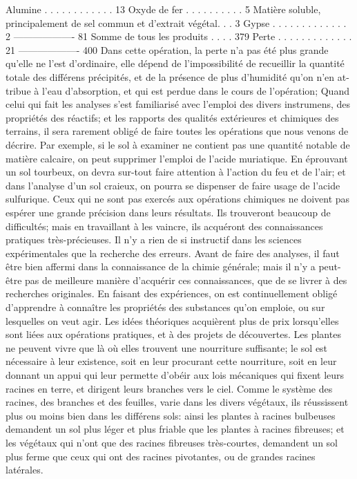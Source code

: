 Alumine . . . . . . . . . . . . 13
Oxyde de fer . . . . . . . . . . 5
Matière soluble, principalement de sel commun et d'extrait végétal. . . 3
Gypse . . . . . . . . . . . . . 2
-------------------                                81
Somme de tous les produits . . . . 379
Perte . . . . . . . . . . . . . 21
-------------------                                   400
Dans cette opération, la perte n'a pas été plus grande qu'elle ne l'est d'ordinaire, elle dépend de l'impossibilité de recueillir la quantité totale des différens précipités, et de la présence de plus d'humidité qu'on n'en at-\setcounter{page}{437} tribue à l'eau d'absorption, et qui est perdue dans le cours de l'opération; Quand celui qui fait les analyses s'est familiarisé avec l'emploi des divers instrumens, des propriétés des réactifs; et les rapports des qualités extérieures et chimiques des terrains, il sera rarement obligé de faire toutes les opérations que nous venons de décrire. Par exemple, si le sol à examiner ne contient pas une quantité notable de matière calcaire, on peut supprimer l'emploi de l'acide muriatique. En éprouvant un sol tourbeux, on devra sur-tout faire attention à l'action du feu et de l'air; et dans l'analyse d'un sol craieux, on pourra se dispenser de faire usage de l'acide sulfurique.
Ceux qui ne sont pas exercés aux opérations chimiques ne doivent pas espérer une grande précision dans leurs résultats. Ils trouveront beaucoup de difficultés; mais en travaillant à les vaincre, ils acquéront des connaissances pratiques très-précieuses. Il n'y a rien de si instructif dans les sciences expérimentales que la recherche des erreurs. Avant de faire des analyses, il faut être bien affermi dans la connaissance de la chimie générale; mais il n'y a peut-être pas de meilleure manière d'acquérir ces connaissances, que de se livrer à des recherches originales. En\setcounter{page}{438} faisant des expériences, on est continuellement obligé d'apprendre à connaître les propriétés des substances qu'on emploie, ou sur lesquelles on veut agir. Les idées théoriques acquièrent plus de prix lorsqu'elles sont liées aux opérations pratiques, et à des projets de découvertes.
Les plantes ne peuvent vivre que là où elles trouvent une nourriture suffisante; le sol est nécessaire à leur existence, soit en leur procurant cette nourriture, soit en leur donnant un appui qui leur permette d'obéir aux lois mécaniques qui fixent leurs racines en terre, et dirigent leurs branches vers le ciel. Comme le système des racines, des branches et des feuilles, varie dans les divers végétaux, ils réussissent plus ou moins bien dans les différens sols: ainsi les plantes à racines bulbeuses demandent un sol plus léger et plus friable que les plantes à racines fibreuses; et les végétaux qui n'ont que des racines fibreuses très-courtes, demandent un sol plus ferme que ceux qui ont des racines pivotantes, ou de grandes racines latérales.
